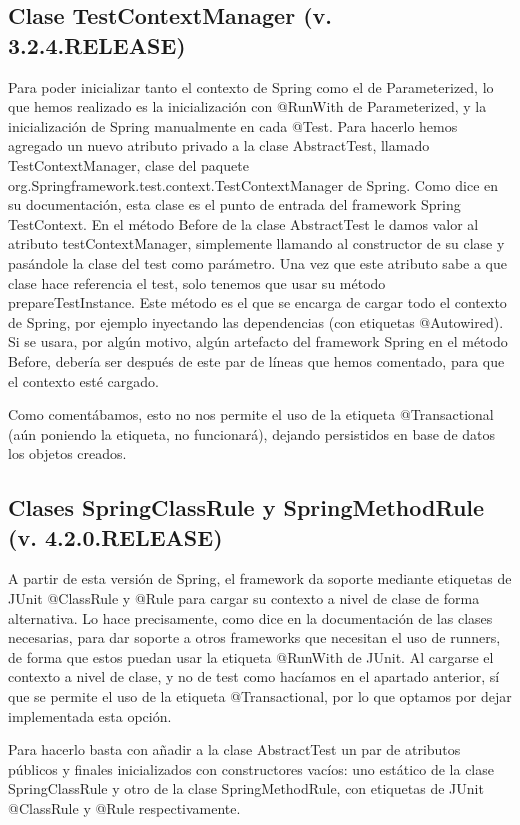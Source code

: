 \documentclass[a4paper]{article}
\begin{document}
\subsection{Clase TestContextManager (v. 3.2.4.RELEASE)}

Para poder inicializar tanto el contexto de Spring como el de Parameterized, lo que hemos realizado es la inicialización con @RunWith de Parameterized, y la inicialización de Spring manualmente en cada @Test. Para hacerlo hemos agregado un nuevo atributo privado a la clase AbstractTest, llamado TestContextManager, clase del paquete org.Springframework.test.context.TestContextManager de Spring. Como dice en su documentación, esta clase es el punto de entrada del framework Spring TestContext. En el método Before de la clase AbstractTest le damos valor al atributo testContextManager, simplemente llamando al constructor de su clase y pasándole la clase del test como parámetro. Una vez que este atributo sabe a que clase hace referencia el test, solo tenemos que usar su método prepareTestInstance. Este método es el que se encarga de cargar todo el contexto de Spring, por ejemplo inyectando las dependencias (con etiquetas @Autowired). Si se usara, por algún motivo, algún artefacto del framework Spring en el método Before, debería ser después de este par de líneas que hemos comentado, para que el contexto esté cargado.

Como comentábamos, esto no nos permite el uso de la etiqueta @Transactional (aún poniendo la etiqueta, no funcionará), dejando persistidos en base de datos los objetos creados. 

\subsection{Clases SpringClassRule y SpringMethodRule \\ (v. 4.2.0.RELEASE)}

A partir de esta versión de Spring, el framework da soporte mediante etiquetas de JUnit @ClassRule y @Rule para cargar su contexto a nivel de clase de forma alternativa. Lo hace precisamente, como dice en la documentación de las clases necesarias, para dar soporte a otros frameworks que necesitan el uso de runners, de forma que estos puedan usar la etiqueta @RunWith de JUnit. Al cargarse el contexto a nivel de clase, y no de test como hacíamos en el apartado anterior, sí que se permite el uso de la etiqueta @Transactional, por lo que optamos por dejar implementada esta opción.

Para hacerlo basta con añadir a la clase AbstractTest un par de atributos públicos y finales inicializados con constructores vacíos: uno estático de la clase SpringClassRule y otro de la clase SpringMethodRule, con etiquetas de JUnit @ClassRule y @Rule respectivamente.
\end{document}
